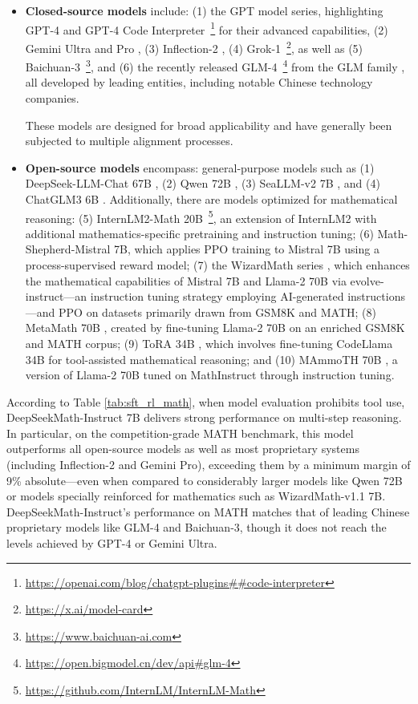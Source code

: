 \begin{itemize}[topsep=0pt]
    \item \textbf{Closed-source models} include: (1) the GPT model series, highlighting GPT-4 \citep{gpt4} and GPT-4 Code Interpreter~\footnote{\url{https://openai.com/blog/chatgpt-plugins\#\#code-interpreter}} for their advanced capabilities, (2) Gemini Ultra and Pro \citep{gemini}, (3) Inflection-2 \citep{inflection-2}, (4) Grok-1~\footnote{\url{https://x.ai/model-card}}, as well as (5) Baichuan-3~\footnote{\url{https://www.baichuan-ai.com}}, and (6) the recently released GLM-4~\footnote{\url{https://open.bigmodel.cn/dev/api\#glm-4}} from the GLM family \citep{glm}, all developed by leading entities, including notable Chinese technology companies.

These models are designed for broad applicability and have generally been subjected to multiple alignment processes.
    \item \textbf{Open-source models} encompass: general-purpose models such as (1) DeepSeek-LLM-Chat 67B \citep{deepseek-llm}, (2) Qwen 72B \citep{qwen}, (3) SeaLLM-v2 7B \citep{seallm}, and (4) ChatGLM3 6B \citep{chatglm3}. Additionally, there are models optimized for mathematical reasoning: (5) InternLM2-Math 20B~\footnote{\url{https://github.com/InternLM/InternLM-Math}}, an extension of InternLM2 with additional mathematics-specific pretraining and instruction tuning; (6) Math-Shepherd-Mistral 7B, which applies PPO training \citep{schulman2017proximal} to Mistral 7B \citep{mistral} using a process-supervised reward model; (7) the WizardMath series \citep{wizardmath}, which enhances the mathematical capabilities of Mistral 7B and Llama-2 70B \citep{llama2} via evolve-instruct—an instruction tuning strategy employing AI-generated instructions—and PPO on datasets primarily drawn from GSM8K and MATH; (8) MetaMath 70B \citep{metamath}, created by fine-tuning Llama-2 70B on an enriched GSM8K and MATH corpus; (9) ToRA 34B \cite{tora}, which involves fine-tuning CodeLlama 34B for tool-assisted mathematical reasoning; and (10) MAmmoTH 70B \citep{MathInstruct}, a version of Llama-2 70B tuned on MathInstruct through instruction tuning.
\end{itemize}

According to Table \ref{tab:sft_rl_math}, when model evaluation prohibits tool use, DeepSeekMath-Instruct 7B delivers strong performance on multi-step reasoning. In particular, on the competition-grade MATH benchmark, this model outperforms all open-source models as well as most proprietary systems (including Inflection-2 and Gemini Pro), exceeding them by a minimum margin of 9\% absolute—even when compared to considerably larger models like Qwen 72B or models specially reinforced for mathematics such as WizardMath-v1.1 7B. DeepSeekMath-Instruct’s performance on MATH matches that of leading Chinese proprietary models like GLM-4 and Baichuan-3, though it does not reach the levels achieved by GPT-4 or Gemini Ultra.

